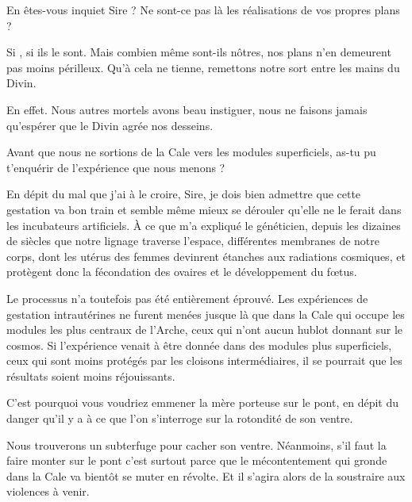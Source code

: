 \begin{drama}
  \alexasspeaks En êtes-vous inquiet Sire ? Ne sont-ce pas là les réalisations de vos propres plans ?

  \elenaspeaks Si \alexas{}, si ils le sont. Mais combien même sont-ils nôtres, nos plans n’en demeurent pas moins périlleux. Qu’à cela ne tienne, remettons notre sort entre les mains du Divin.

  \alexasspeaks En effet. Nous autres mortels avons beau instiguer, nous ne faisons jamais qu’espérer que le Divin agrée nos desseins.

  \elenaspeaks Avant que nous ne sortions de la Cale vers les modules superficiels, as-tu pu t’enquérir de l’expérience que nous menons ?

  \alexasspeaks En dépit du mal que j’ai à le croire, Sire, je dois bien admettre que cette gestation va bon train et semble même mieux se dérouler qu’elle ne le ferait dans les incubateurs artificiels. À ce que m’a expliqué le généticien, depuis les dizaines de siècles que notre lignage traverse l’espace, différentes membranes de notre corps, dont les utérus des femmes devinrent étanches aux radiations cosmiques, et protègent donc la fécondation des ovaires et le développement du fœtus.

  \elenaspeaks Le processus n’a toutefois pas été entièrement éprouvé. Les expériences de gestation intrautérines ne furent menées jusque là que dans la Cale qui occupe les modules les plus centraux de l’Arche, ceux qui n’ont aucun hublot donnant sur le cosmos. Si l’expérience venait à être donnée dans des modules plus superficiels, ceux qui sont moins protégés par les cloisons intermédiaires, il se pourrait que les résultats soient moins réjouissants.

  \alexasspeaks C’est pourquoi vous voudriez emmener la mère porteuse sur le pont, en dépit du danger qu’il y a à ce que l’on s’interroge sur la rotondité de son ventre.

  \elenaspeaks Nous trouverons un subterfuge pour cacher son ventre. Néanmoins, s’il faut la faire monter sur le pont c’est surtout parce que le mécontentement qui gronde dans la Cale va bientôt se muter en révolte. Et il s’agira alors de la soustraire aux violences à venir.
\end{drama}

\scene


\StageDirII{\elena, \alexas}



